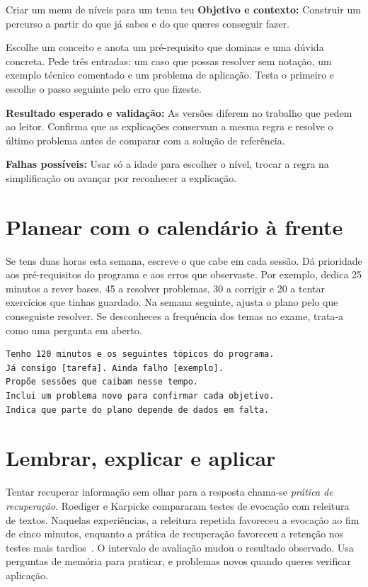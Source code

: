 \begin{promptlabbox}{Criar um menu de níveis para um tema teu}
\textbf{Objetivo e contexto:} Construir um percurso a partir do que já sabes e do que queres conseguir fazer.

Escolhe um conceito e anota um pré-requisito que dominas e uma dúvida concreta. Pede três entradas: um caso que possas resolver sem notação, um exemplo técnico comentado e um problema de aplicação. Testa o primeiro e escolhe o passo seguinte pelo erro que fizeste.

\textbf{Resultado esperado e validação:} As versões diferem no trabalho que pedem ao leitor. Confirma que as explicações conservam a mesma regra e resolve o último problema antes de comparar com a solução de referência.

\textbf{Falhas possíveis:} Usar só a idade para escolher o nível, trocar a regra na simplificação ou avançar por reconhecer a explicação.
\end{promptlabbox}

\section{Planear com o calendário à frente}

Se tens duas horas esta semana, escreve o que cabe em cada sessão. Dá prioridade aos pré-requisitos do programa e aos erros que observaste. Por exemplo, dedica 25 minutos a rever bases, 45 a resolver problemas, 30 a corrigir e 20 a tentar exercícios que tinhas guardado. Na semana seguinte, ajusta o plano pelo que conseguiste resolver. Se desconheces a frequência dos temas no exame, trata-a como uma pergunta em aberto.

\begin{lstlisting}
Tenho 120 minutos e os seguintes tópicos do programa.
Já consigo [tarefa]. Ainda falho [exemplo].
Propõe sessões que caibam nesse tempo.
Inclui um problema novo para confirmar cada objetivo.
Indica que parte do plano depende de dados em falta.
\end{lstlisting}

\section{Lembrar, explicar e aplicar}

Tentar recuperar informação sem olhar para a resposta chama-se \emph{prática de recuperação}. Roediger e Karpicke compararam testes de evocação com releitura de textos. Naquelas experiências, a releitura repetida favoreceu a evocação ao fim de cinco minutos, enquanto a prática de recuperação favoreceu a retenção nos testes mais tardios~\citep{roedigerkarpicke2006}. O intervalo de avaliação mudou o resultado observado. Usa perguntas de memória para praticar, e problemas novos quando queres verificar aplicação.

